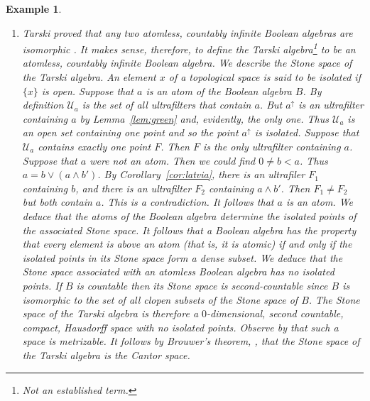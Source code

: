 \documentclass[a4paper]{amsart}
\newtheorem{example}[theorem]{Example}
\begin{document}
\begin{example}
{\begin{enumerate}
\item Tarski proved that any two atomless, countably infinite Boolean algebras are isomorphic \cite[Chapter 16, Theorem 10]{GH}.
It makes sense, therefore, to define the {\em Tarski algebra}\footnote{Not an established term.} to be an atomless, countably infinite Boolean algebra.
We describe the Stone space of the Tarski algebra.
An element $x$ of a topological space is said to be {\em isolated} if $\{x\}$ is open.
Suppose that $a$ is an atom of the Boolean algebra $B$.
By definition $\mathscr{U}_{a}$ is the set of all ultrafilters that contain $a$.
But $a^{\uparrow}$ is an ultrafilter containing $a$ by Lemma~\ref{lem:green} and, evidently, the only one.
Thus $\mathscr{U}_{a}$ is an open set containing one point and so the point $a^{\uparrow}$ is isolated.
Suppose that $\mathscr{U}_{a}$ contains exactly one point $F$.
Then $F$ is the only ultrafilter containing $a$.
Suppose that $a$ were not an atom.
Then we could find $0 \neq b < a$.
Thus $a = b \vee (a \wedge b')$.
By Corollary~\ref{cor:latvia}, 
there is an ultrafiler $F_{1}$ containing $b$,
and there is an ultrafilter $F_{2}$ containing $a \wedge b'$.
Then $F_{1} \neq F_{2}$ but both contain $a$.
This is a contradiction.
It follows that $a$ is an atom.
We deduce that the atoms of the Boolean algebra determine
the isolated points of the associated Stone space.
It follows that a Boolean algebra has the property that every element is above an atom (that is, it is {\em atomic})
if and only if the isolated points in its Stone space form a dense subset.
We deduce that the Stone space associated with an atomless Boolean algebra has no isolated points.
If $B$ is countable then its Stone space is second-countable since
$B$ is isomorphic to the set of all clopen subsets of the Stone space of $B$.
The Stone space of the Tarski algebra is therefore  
a $0$-dimensional, second countable, compact, Hausdorff space with no isolated points.
Observe by \cite[Theorem 9.5.10]{Vickers} that such a space is metrizable.
It follows by Brouwer's theorem, \cite[Theorem 30.3]{Willard}, that the Stone space of the Tarski algebra
is the {\em Cantor space}.


\end{enumerate}}
\end{example}
\end{document}
